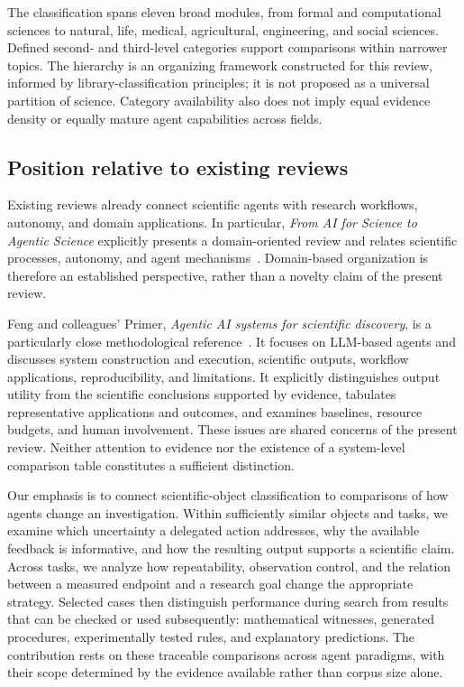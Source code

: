 The classification spans eleven broad modules, from formal and computational sciences to natural, life, medical, agricultural, engineering, and social sciences. Defined second- and third-level categories support comparisons within narrower topics. The hierarchy is an organizing framework constructed for this review, informed by library-classification principles; it is not proposed as a universal partition of science. Category availability also does not imply equal evidence density or equally mature agent capabilities across fields.

\subsection{Position relative to existing reviews}

Existing reviews already connect scientific agents with research workflows, autonomy, and domain applications. In particular, \emph{From AI for Science to Agentic Science} explicitly presents a domain-oriented review and relates scientific processes, autonomy, and agent mechanisms~\cite{wei2025}. Domain-based organization is therefore an established perspective, rather than a novelty claim of the present review.

Feng and colleagues' Primer, \emph{Agentic AI systems for scientific discovery}, is a particularly close methodological reference~\cite{feng2026}. It focuses on LLM-based agents and discusses system construction and execution, scientific outputs, workflow applications, reproducibility, and limitations. It explicitly distinguishes output utility from the scientific conclusions supported by evidence, tabulates representative applications and outcomes, and examines baselines, resource budgets, and human involvement. These issues are shared concerns of the present review. Neither attention to evidence nor the existence of a system-level comparison table constitutes a sufficient distinction.

Our emphasis is to connect scientific-object classification to comparisons of how agents change an investigation. Within sufficiently similar objects and tasks, we examine which uncertainty a delegated action addresses, why the available feedback is informative, and how the resulting output supports a scientific claim. Across tasks, we analyze how repeatability, observation control, and the relation between a measured endpoint and a research goal change the appropriate strategy. Selected cases then distinguish performance during search from results that can be checked or used subsequently: mathematical witnesses, generated procedures, experimentally tested rules, and explanatory predictions. The contribution rests on these traceable comparisons across agent paradigms, with their scope determined by the evidence available rather than corpus size alone.


